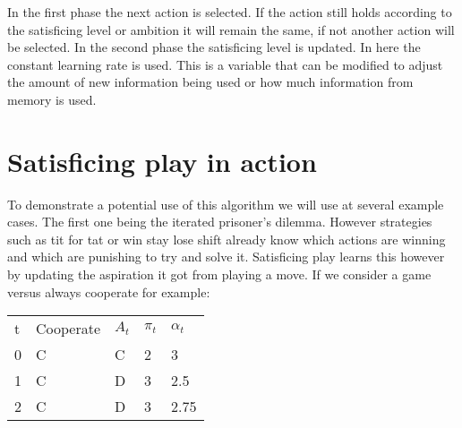\toReview In the first phase the next action is selected. If the action still holds
according to the satisficing level or ambition it will remain the same, if not another
action will be selected. In the second phase the satisficing level is updated.
In here the constant learning rate is used. This is a variable that can be
modified to adjust the amount of new information being used or how much
information from memory is used.


\section{Satisficing play in action}
\drafting
To demonstrate a potential use of this algorithm we will use at several example
cases. The first one being the iterated prisoner's dilemma.
\drafting However strategies such as tit for tat or win stay lose shift already know
which actions are winning and which are punishing to try and solve it.
Satisficing play learns this however by updating the aspiration it got from
playing a move. If we consider a game versus always cooperate for example:

\begin{tabular}{lllll}
    t & Cooperate & $A_t$ & $\pi_t$ & $\alpha_t$ \\
    0 & C     & C    & 2       & 3 \\
    1 & C     & D    & 3       & 2.5 \\
    2 & C     & D    & 3       & 2.75 \\
\end{tabular}


